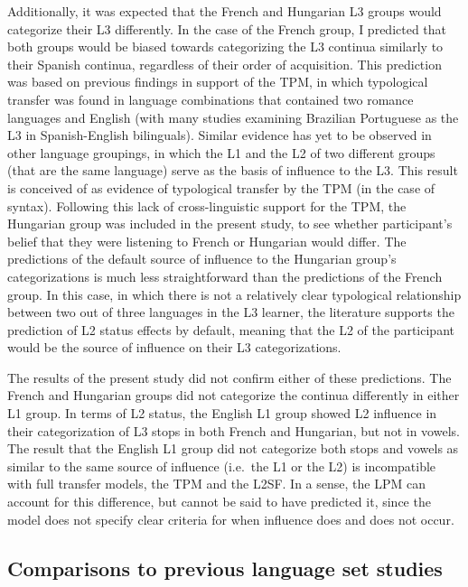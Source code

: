 \documentclass[
  man]{apa6}
\begin{document}
Additionally, it was expected that the French and Hungarian L3 groups would categorize their L3 differently. In the case of the French group, I predicted that both groups would be biased towards categorizing the L3 continua similarly to their Spanish continua, regardless of their order of acquisition.
This prediction was based on previous findings in support of the TPM, in which typological transfer was found in language combinations that contained two romance languages and English (with many studies examining Brazilian Portuguese as the L3 in Spanish-English bilinguals).
Similar evidence has yet to be observed in other language groupings, in which the L1 and the L2 of two different groups (that are the same language) serve as the basis of influence to the L3. This result is conceived of as evidence of typological transfer by the TPM (in the case of syntax).
Following this lack of cross-linguistic support for the TPM, the Hungarian group was included in the present study, to see whether participant's belief that they were listening to French or Hungarian would differ.
The predictions of the default source of influence to the Hungarian group's categorizations is much less straightforward than the predictions of the French group.
In this case, in which there is not a relatively clear typological relationship between two out of three languages in the L3 learner, the literature supports the prediction of L2 status effects by default, meaning that the L2 of the participant would be the source of influence on their L3 categorizations.

The results of the present study did not confirm either of these predictions. The French and Hungarian groups did not categorize the continua differently in either L1 group.
In terms of L2 status, the English L1 group showed L2 influence in their categorization of L3 stops in both French and Hungarian, but not in vowels. The result that the English L1 group did not categorize both stops and vowels as similar to the same source of influence (i.e.~the L1 or the L2) is incompatible with full transfer models, the TPM and the L2SF.
In a sense, the LPM can account for this difference, but cannot be said to have predicted it, since the model does not specify clear criteria for when influence does and does not occur.

\hypertarget{comparisons-to-previous-language-set-studies}{%
\subsection{Comparisons to previous language set studies}\label{comparisons-to-previous-language-set-studies}}
\end{document}
